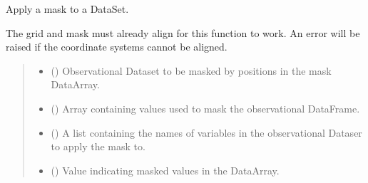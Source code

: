 \documentclass[letterpaper,10pt,english]{sphinxmanual}
\begin{document}

\begin{fulllineitems}
\label{\detokenize{misc:glomar_gridding.mask.mask_dataset}}
\pysigstartsignatures
\pysiglinewithargsret
{}
{\sphinxparamcomma {}\sphinxparamcomma {}\sphinxparamcomma {}\sphinxparamcomma {}}
{}
\pysigstopsignatures
\sphinxAtStartPar
Apply a mask to a DataSet.

\sphinxAtStartPar
The grid and mask must already align for this function to work. An error
will be raised if the coordinate systems cannot be aligned.
\begin{quote}\begin{description}
\begin{itemize}
\item {}
\sphinxAtStartPar
{} () \textendash{} Observational Dataset to be masked by positions in the mask
DataArray.

\item {}
\sphinxAtStartPar
{} () \textendash{} Array containing values used to mask the observational DataFrame.

\item {}
\sphinxAtStartPar
{} (\sphinxstyleliteralemphasis{\sphinxupquote{ | }}\sphinxstyleliteralemphasis{\sphinxupquote{{[}}}\sphinxstyleliteralemphasis{\sphinxupquote{{]}}}) \textendash{} A list containing the names of  variables in the observational Dataser
to apply the mask to.

\item {}
\sphinxAtStartPar
{} () \textendash{} Value indicating masked values in the DataArray.


\end{itemize}
\end{description}
\end{quote}
\end{fulllineitems}
\end{document}
